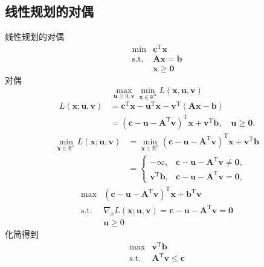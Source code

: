 \subsection{线性规划的对偶}
\begin{example}
    线性规划的对偶
    \[
        \begin{array}{rl}
            \min & \boldsymbol{c}^\mathrm{T}\boldsymbol{x}\\
            \mathrm{s.t.} & \boldsymbol{Ax}=\boldsymbol{b}\\
            & \boldsymbol{x}\geqslant\boldsymbol{0}
        \end{array}
    \]
    对偶
    \[
        \max_{\boldsymbol{u}\geq0,\boldsymbol{v}}\min_{\boldsymbol{x}\in \mathbb{R}^n}L(\boldsymbol{x},\boldsymbol{u},\boldsymbol{v})
    \]
    \[
        \begin{aligned}
            L(\boldsymbol{x};\boldsymbol{u},\boldsymbol{v})&=\boldsymbol{c}^\mathrm{T}\boldsymbol{x}-\boldsymbol{u}^\mathrm{T}\boldsymbol{x}-\boldsymbol{v}^\mathrm{T}(\boldsymbol{A}\boldsymbol{x}-\boldsymbol{b})\\
            &=\left(\boldsymbol{c}-\boldsymbol{u}-\boldsymbol{A}^\mathrm{T}\boldsymbol{v}\right)^\mathrm{T}\boldsymbol{x}+\boldsymbol{v}^\mathrm{T}\boldsymbol{b},\quad\boldsymbol{u}\geqslant\boldsymbol{0}.
        \end{aligned}
    \]
    \[
        \begin{aligned}
            \min_{\boldsymbol{x}\in\mathbb{R}^n}L(\boldsymbol{x};\boldsymbol{u},\boldsymbol{v})&=\min_{\boldsymbol{x}\in\mathbb{R}^n}\left(\boldsymbol{c}-\boldsymbol{u}-\boldsymbol{A}^\mathrm{T}\boldsymbol{v}\right)^\mathrm{T}\boldsymbol{x}+\boldsymbol{v}^\mathrm{T}\boldsymbol{b}\\
            &=\begin{cases}
                -\infty, & \boldsymbol{c}-\boldsymbol{u}-\boldsymbol{A}^\mathrm{T}\boldsymbol{v}\neq \boldsymbol{0} ,\\
                \boldsymbol{v}^\mathrm{T}\boldsymbol{b},& \boldsymbol{c}-\boldsymbol{u}-\boldsymbol{A}^\mathrm{T}\boldsymbol{v}= \boldsymbol{0},
            \end{cases}
        \end{aligned}
    \]
    \[
        \begin{array}{rl}
            \max & (\boldsymbol{c}-\boldsymbol{u}-\boldsymbol{A}^\mathrm{T}\boldsymbol{v})^\mathrm{T}\boldsymbol{x}+\boldsymbol{b}^\mathrm{T}\boldsymbol{v}  \\
            \mathrm{s.t.} & \nabla_{x}L(\boldsymbol{x};\boldsymbol{u},\boldsymbol{v})=\boldsymbol{c}-\boldsymbol{u}-\boldsymbol{A}^{\mathrm{T}}\boldsymbol{v}=\boldsymbol{0}  \\
            &\boldsymbol{u}\geqslant 0
        \end{array}
    \]
    化简得到
    \[
        \begin{array}{rl}
            \max&\boldsymbol{v}^\mathrm{T}\boldsymbol{b}\\
            \mathrm{s.t.}&\boldsymbol{A}^\mathrm{T}\boldsymbol{v}\leqslant \boldsymbol{c}
        \end{array}
    \]
\end{example}
